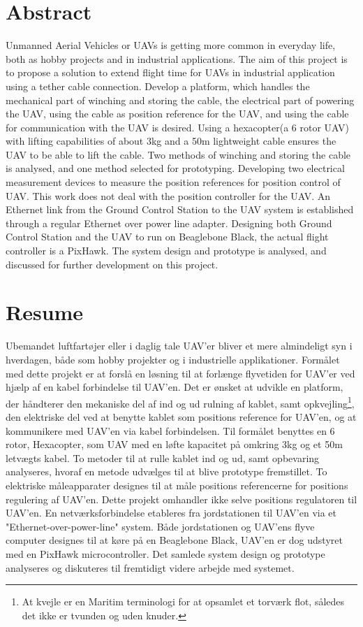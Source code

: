 \chapter{Abstract}
Unmanned Aerial Vehicles or UAVs is getting more common in everyday life, both as hobby projects and in industrial applications. The aim of this project is to propose a solution to extend flight time for UAVs in industrial application using a tether cable connection. Develop a platform, which handles the mechanical part of winching and storing the cable, the electrical part of powering the UAV, using the cable as position reference for the UAV, and using the cable for communication with the UAV is desired.
Using a hexacopter(a 6 rotor UAV) with lifting capabilities of about 3kg and a 50m lightweight cable ensures the UAV to be able to lift the cable.
Two methods of winching and storing the cable is analysed, and one method selected for prototyping.
Developing two electrical measurement devices to measure the position references for position control of UAV. This work does not deal with the position controller for the UAV.
An Ethernet link from the Ground Control Station to the UAV system is established through a regular Ethernet over power line adapter.
Designing both Ground Control Station and the UAV to run on Beaglebone Black, the actual flight controller is a PixHawk.
The system design and prototype is analysed, and discussed for further development on this project.


\chapter{Resume}
Ubemandet luftfartøjer eller i daglig tale UAV'er bliver et mere almindeligt syn i hverdagen, både som hobby projekter og i industrielle applikationer. Formålet med dette projekt er at forslå en løsning til at forlænge flyvetiden for UAV'er ved hjælp af en kabel forbindelse til UAV'en. Det er ønsket at udvikle en platform, der håndterer den mekaniske del af ind og ud rulning af kablet, samt opkvejling\footnote{At kvejle er en Maritim terminologi for at opsamlet et torværk flot, således det ikke er tvunden og uden knuder.}, den elektriske del ved at benytte kablet som positions reference for UAV'en, og at kommunikere med UAV'en via kabel forbindelsen.
Til formålet benyttes en 6 rotor, Hexacopter, som UAV med en løfte kapacitet på omkring 3kg og et 50m letvægts kabel.
To metoder til at rulle kablet ind og ud, samt opbevaring analyseres, hvoraf en metode udvælges til at blive prototype fremstillet.
To elektriske måleapparater designes til at måle positions referencerne for positions regulering af UAV'en. Dette projekt omhandler ikke selve positions regulatoren til UAV'en. En netværksforbindelse etableres fra jordstationen til UAV'en via et "Ethernet-over-power-line" system. Både jordstationen og UAV'ens flyve computer designes til at køre på en Beaglebone Black, UAV'en er dog udstyret med en PixHawk microcontroller.
Det samlede system design og prototype analyseres og diskuteres til fremtidigt videre arbejde med systemet.  